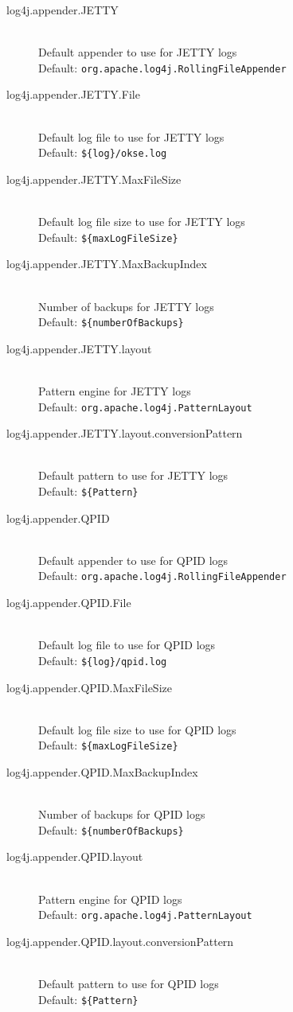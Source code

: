 \begin{description}
  \item[log4j.appender.JETTY] \hfill \\
  Default appender to use for JETTY logs \hfill \\ Default: \verb!org.apache.log4j.RollingFileAppender!
  \item[log4j.appender.JETTY.File] \hfill \\
  Default log file to use for JETTY logs \hfill \\ Default: \verb!${log}/okse.log!
   \item[log4j.appender.JETTY.MaxFileSize] \hfill \\
  Default log file size to use for JETTY logs \hfill \\ Default: \verb!${maxLogFileSize}!
   \item[log4j.appender.JETTY.MaxBackupIndex] \hfill \\
  Number of backups for JETTY logs \hfill \\ Default: \verb!${numberOfBackups}!
   \item[log4j.appender.JETTY.layout] \hfill \\
  Pattern engine for JETTY logs \hfill \\ Default: \verb!org.apache.log4j.PatternLayout!
   \item[log4j.appender.JETTY.layout.conversionPattern] \hfill \\
  Default pattern to use for JETTY logs \hfill \\ Default: \verb!${Pattern}!
  
    \item[log4j.appender.QPID] \hfill \\
  Default appender to use for QPID logs \hfill \\ Default: \verb!org.apache.log4j.RollingFileAppender!
  \item[log4j.appender.QPID.File] \hfill \\
  Default log file to use for QPID logs \hfill \\ Default: \verb!${log}/qpid.log!
   \item[log4j.appender.QPID.MaxFileSize] \hfill \\
  Default log file size to use for QPID logs \hfill \\ Default: \verb!${maxLogFileSize}!
   \item[log4j.appender.QPID.MaxBackupIndex] \hfill \\
  Number of backups for QPID logs \hfill \\ Default: \verb!${numberOfBackups}!
   \item[log4j.appender.QPID.layout] \hfill \\
  Pattern engine for QPID logs \hfill \\ Default: \verb!org.apache.log4j.PatternLayout!
   \item[log4j.appender.QPID.layout.conversionPattern] \hfill \\
  Default pattern to use for QPID logs \hfill \\ Default: \verb!${Pattern}!


\end{description}
